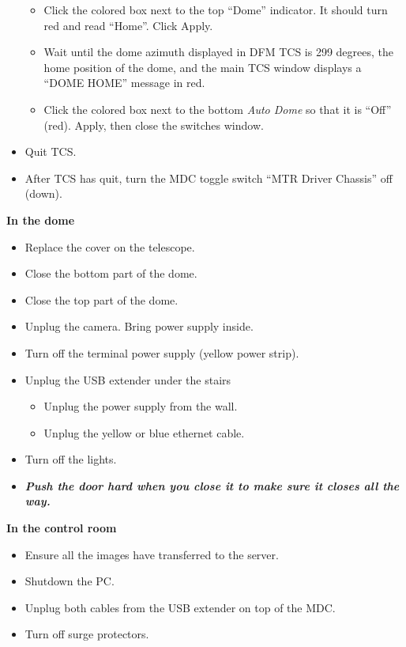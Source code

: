 \documentclass[letterpaper, 12pt]{report}
\newcommand{\location}[1]{\noindent\large{\textbf{#1}}}
\newcommand{\indome}{\location{In the dome}}
\newcommand{\incontrol}{\location{In the control room}}
\begin{document}
\begin{itemize}
\begin{itemize}
			\item Click the colored box next to the top ``Dome'' indicator. It should turn red and read ``Home''. Click Apply.
			\item Wait until the dome azimuth displayed in DFM TCS is 299 degrees, the home position of the dome, and the main TCS window displays a ``DOME HOME'' message in red.
			\item Click the colored box next to the bottom \emph{Auto Dome} so that it is ``Off'' (red). Apply, then close the switches window.
		\end{itemize}
		\item Quit TCS.
		\item After TCS has quit, turn the MDC toggle switch ``MTR Driver Chassis'' off (down).
	\end{itemize}

\indome

\begin{itemize}
	\item Replace the cover on the telescope.
	\item Close the bottom part of the dome.
	\item Close the top part of the dome.
	\item Unplug the camera. Bring power supply inside.
	\item Turn off the terminal power supply (yellow power strip).
	\item Unplug the USB extender under the stairs
		\begin{itemize}
			\item Unplug the power supply from the wall.
			\item Unplug the yellow or blue ethernet cable.
		\end{itemize}
	\item Turn off the lights.
	\item \textbf{\emph{Push the door hard when you close it to make sure it closes all the way.}}
\end{itemize}

\incontrol

\begin{itemize}
	\item Ensure all the images have transferred to the server.
	\item Shutdown the PC.
	\item Unplug both cables from the USB extender on top of the MDC.
	\item Turn off surge protectors.
\end{itemize}
\end{document}
